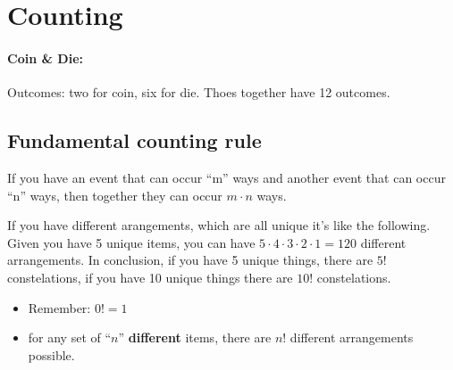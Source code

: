 \section{Counting}

\paragraph{Coin \& Die: }
Outcomes: two for coin, six for die. Thoes together have 12 outcomes.

\subsection{Fundamental counting rule}
If you have an event that can occur ``m'' ways and another event that can occur ``n'' ways, then together they can occur $m\cdot n$ ways.


If you have different arangements, which are all unique it's like the following.
Given you have 5 unique items, you can have $5\cdot 4\cdot 3\cdot 2\cdot 1=120$ different arrangements.
In conclusion, if you have 5 unique things, there are $5!$ constelations, if you have 10 unique things there are $10!$ constelations.

\begin{itemize}
    \item Remember: $0! = 1$
    \item for any set of ``$n$'' \textbf{different} items, there are $n!$ different arrangements possible.
\end{itemize}


